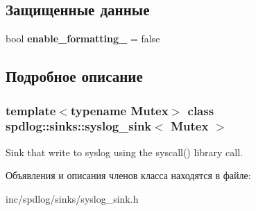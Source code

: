 \subsection*{Защищенные данные}
\begin{DoxyCompactItemize}
\item 
\mbox{\label{classspdlog_1_1sinks_1_1syslog__sink_a6bbfe4d4a48a416c08d906383eb1af67}} 
bool {\bfseries enable\+\_\+formatting\+\_\+} = false
\end{DoxyCompactItemize}


\subsection{Подробное описание}
\subsubsection*{template$<$typename Mutex$>$\newline
class spdlog\+::sinks\+::syslog\+\_\+sink$<$ Mutex $>$}

Sink that write to syslog using the {\ttfamily syscall()} library call. 

Объявления и описания членов класса находятся в файле\+:\begin{DoxyCompactItemize}
\item 
inc/spdlog/sinks/syslog\+\_\+sink.\+h\end{DoxyCompactItemize}
